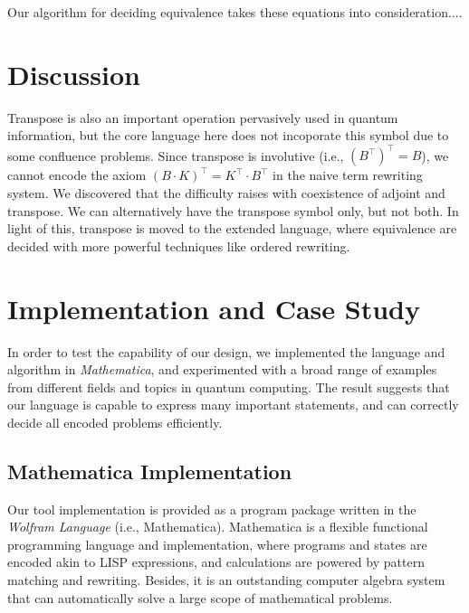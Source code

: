 \documentclass[manuscript, review, timestamp]{acmart}
\begin{document}
Our algorithm for deciding equivalence takes these equations into consideration....


\section{Discussion}

Transpose is also an important operation pervasively used in quantum information, but the core language here does not incoporate this symbol due to some confluence problems. Since transpose is involutive (i.e., $(B^\top)^\top = B$), we cannot encode the axiom $ (B \cdot K)^\top = K^\top \cdot B^\top$ in the naive term rewriting system. We discovered that the difficulty raises with coexistence of adjoint and transpose. We can alternatively have the transpose symbol only, but not both. In light of this, transpose is moved to the extended language, where equivalence are decided with more powerful techniques like ordered rewriting.


\section{Implementation and Case Study}

In order to test the capability of our design, we implemented the language and algorithm in \textit{Mathematica}, and experimented with a broad range of examples from different fields and topics in quantum computing. The result suggests that our language is capable to express many important statements, and can correctly decide all encoded problems efficiently.

\subsection{Mathematica Implementation}
Our tool implementation is provided as a program package written in the \textit{Wolfram Language} (i.e., Mathematica). 
Mathematica is a flexible functional programming language and implementation, where programs and states are encoded akin to LISP expressions, and calculations are powered by pattern matching and rewriting. Besides, it is an outstanding computer algebra system that can automatically solve a large scope of mathematical problems.
\end{document}
